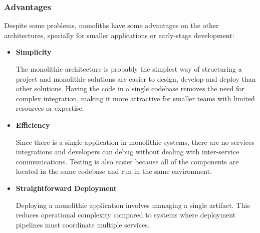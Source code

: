 \subsubsection{Advantages}
Despite some problems, monoliths have some advantages on the other architectures,
specially for smaller applications or early-stage development:
\begin{itemize}
	\item \textbf{Simplicity}

	      The monolithic architecture is probably the simplest way of structuring a
	      project and monolithic solutions are easier to design, develop and deploy
	      than other solutions.
	      Having the code in a single codebase removes the need for complex
	      integration, making it more attractive for smaller teams with limited
	      resources or expertise.
	\item \textbf{Efficiency}

	      Since there is a single application in monolithic systems, there are no
	      services integrations and developers can debug without dealing with
	      inter-service communications. Testing is also easier because all of the
	      components are located in the same codebase and run in the same environment.
	\item \textbf{Straightforward Deployment}

	      Deploying a monolithic application involves managing a single artifact. This
	      reduces operational complexity compared to systems where deployment
	      pipelines must coordinate multiple services.
\end{itemize}
